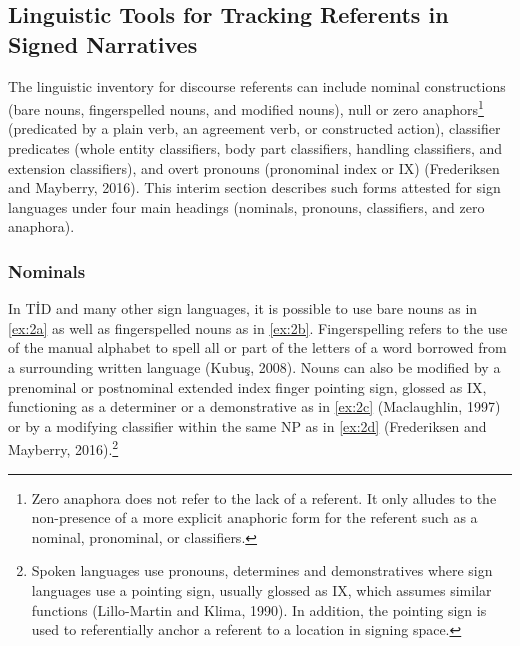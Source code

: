 \documentclass[]{elsarticle} %
\begin{document}
\hypertarget{linguistic-tools-for-tracking-referents-in-signed-narratives}{%
\subsection{Linguistic Tools for Tracking Referents in Signed
Narratives}\label{linguistic-tools-for-tracking-referents-in-signed-narratives}}

The linguistic inventory for discourse referents can include nominal
constructions (bare nouns, fingerspelled nouns, and modified nouns),
null or zero
anaphors\footnote{Zero anaphora does not refer to the lack of a referent. It only alludes to the non-presence of a more explicit anaphoric form for the referent such as a nominal, pronominal, or classifiers.}
(predicated by a plain verb, an agreement verb, or constructed action),
classifier predicates (whole entity classifiers, body part classifiers,
handling classifiers, and extension classifiers), and overt pronouns
(pronominal index or IX) (Frederiksen and Mayberry, 2016). This interim
section describes such forms attested for sign languages under four main
headings (nominals, pronouns, classifiers, and zero anaphora).

\hypertarget{nominals}{%
\subsubsection{Nominals}\label{nominals}}

In TİD and many other sign languages, it is possible to use bare nouns
as in \ref{ex:2a} as well as fingerspelled nouns as in \ref{ex:2b}.
Fingerspelling refers to the use of the manual alphabet to spell all or
part of the letters of a word borrowed from a surrounding written
language (Kubuş, 2008). Nouns can also be modified by a prenominal or
postnominal extended index finger pointing sign, glossed as IX,
functioning as a determiner or a demonstrative as in \ref{ex:2c}
(Maclaughlin, 1997) or by a modifying classifier within the same NP as
in \ref{ex:2d} (Frederiksen and Mayberry,
2016).\footnote{Spoken languages use pronouns, determines and demonstratives where sign languages use a pointing sign, usually glossed as IX, which assumes similar functions (Lillo-Martin and Klima, 1990). In addition, the pointing sign is used to referentially anchor a referent to a location in signing space.}
\end{document}
